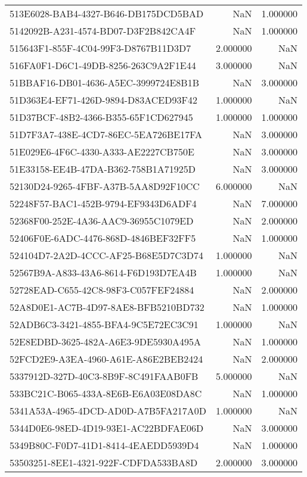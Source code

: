 \begin{tabular}{lrr}
513E6028-BAB4-4327-B646-DB175DCD5BAD & NaN & 1.000000 \\
5142092B-A231-4574-BD07-D3F2B842CA4F & NaN & 1.000000 \\
515643F1-855F-4C04-99F3-D8767B11D3D7 & 2.000000 & NaN \\
516FA0F1-D6C1-49DB-8256-263C9A2F1E44 & 3.000000 & NaN \\
51BBAF16-DB01-4636-A5EC-3999724E8B1B & NaN & 3.000000 \\
51D363E4-EF71-426D-9894-D83ACED93F42 & 1.000000 & NaN \\
51D37BCF-48B2-4366-B355-65F1CD627945 & 1.000000 & 1.000000 \\
51D7F3A7-438E-4CD7-86EC-5EA726BE17FA & NaN & 3.000000 \\
51E029E6-4F6C-4330-A333-AE2227CB750E & NaN & 3.000000 \\
51E33158-EE4B-47DA-B362-758B1A71925D & NaN & 3.000000 \\
52130D24-9265-4FBF-A37B-5AA8D92F10CC & 6.000000 & NaN \\
52248F57-BAC1-452B-9794-EF9343D6ADF4 & NaN & 7.000000 \\
52368F00-252E-4A36-AAC9-36955C1079ED & NaN & 2.000000 \\
52406F0E-6ADC-4476-868D-4846BEF32FF5 & NaN & 1.000000 \\
524104D7-2A2D-4CCC-AF25-B68E5D7C3D74 & 1.000000 & NaN \\
52567B9A-A833-43A6-8614-F6D193D7EA4B & 1.000000 & NaN \\
52728EAD-C655-42C8-98F3-C057FEF24884 & NaN & 2.000000 \\
52A8D0E1-AC7B-4D97-8AE8-BFB5210BD732 & NaN & 1.000000 \\
52ADB6C3-3421-4855-BFA4-9C5E72EC3C91 & 1.000000 & NaN \\
52E8EDBD-3625-482A-A6E3-9DE5930A495A & NaN & 1.000000 \\
52FCD2E9-A3EA-4960-A61E-A86E2BEB2424 & NaN & 2.000000 \\
5337912D-327D-40C3-8B9F-8C491FAAB0FB & 5.000000 & NaN \\
533BC21C-B065-433A-8E6B-E6A03E08DA8C & NaN & 1.000000 \\
5341A53A-4965-4DCD-AD0D-A7B5FA217A0D & 1.000000 & NaN \\
5344D0E6-98ED-4D19-93E1-AC22BDFAE06D & NaN & 3.000000 \\
5349B80C-F0D7-41D1-8414-4EAEDD5939D4 & NaN & 1.000000 \\
53503251-8EE1-4321-922F-CDFDA533BA8D & 2.000000 & 3.000000 \\

\end{tabular}
